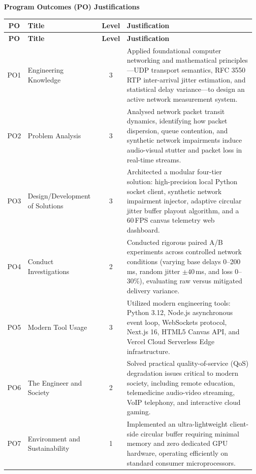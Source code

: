 \documentclass[12pt, a4paper]{report}
\begin{document}
\vspace{0.4cm}
\noindent\textbf{\large Program Outcomes (PO) Justifications}
\vspace{0.2cm}

\begin{xltabular}{\textwidth}{|c|p{3.2cm}|c|L|}
\hline
\textbf{PO} & \textbf{Title} & \textbf{Level} & \textbf{Justification} \\
\hline
\endfirsthead
\hline
\textbf{PO} & \textbf{Title} & \textbf{Level} & \textbf{Justification} \\
\hline
\endhead

PO1 & Engineering Knowledge & 3 & Applied foundational computer networking and mathematical principles---UDP transport semantics, RFC 3550 RTP inter-arrival jitter estimation, and statistical delay variance---to design an active network measurement system. \\
\hline
PO2 & Problem Analysis & 3 & Analysed network packet transit dynamics, identifying how packet dispersion, queue contention, and synthetic network impairments induce audio-visual stutter and packet loss in real-time streams. \\
\hline
PO3 & Design/Development of Solutions & 3 & Architected a modular four-tier solution: high-precision local Python socket client, synthetic network impairment injector, adaptive circular jitter buffer playout algorithm, and a 60\,FPS canvas telemetry web dashboard. \\
\hline
PO4 & Conduct Investigations & 2 & Conducted rigorous paired A/B experiments across controlled network conditions (varying base delays 0--200\,ms, random jitter $\pm 40$\,ms, and loss 0--30\%), evaluating raw versus mitigated delivery variance. \\
\hline
PO5 & Modern Tool Usage & 3 & Utilized modern engineering tools: Python 3.12, Node.js asynchronous event loop, WebSockets protocol, Next.js 16, HTML5 Canvas API, and Vercel Cloud Serverless Edge infrastructure. \\
\hline
PO6 & The Engineer and Society & 2 & Solved practical quality-of-service (QoS) degradation issues critical to modern society, including remote education, telemedicine audio-video streaming, VoIP telephony, and interactive cloud gaming. \\
\hline
PO7 & Environment and Sustainability & 1 & Implemented an ultra-lightweight client-side circular buffer requiring minimal memory and zero dedicated GPU hardware, operating efficiently on standard consumer microprocessors. \\

\end{xltabular}
\end{document}
